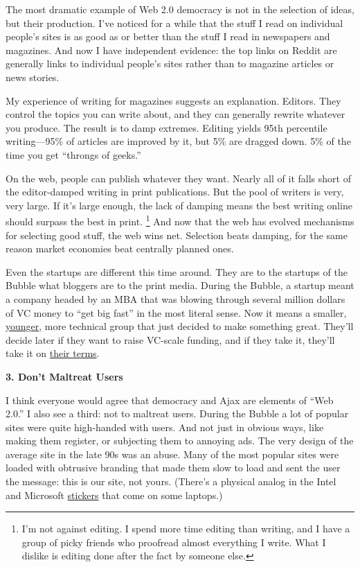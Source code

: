 \documentclass[12pt]{book}
\begin{document}
The most dramatic example of Web 2.0 democracy is not in the selection
of ideas, but their production. I've noticed for a while that the stuff
I read on individual people's sites is as good as or better than the
stuff I read in newspapers and magazines. And now I have independent
evidence: the top links on Reddit are generally links to individual
people's sites rather than to magazine articles or news stories.

My experience of writing for magazines suggests an explanation. Editors.
They control the topics you can write about, and they can generally
rewrite whatever you produce. The result is to damp extremes. Editing
yields 95th percentile writing---95\% of articles are improved by it,
but 5\% are dragged down. 5\% of the time you get ``throngs of geeks.''

On the web, people can publish whatever they want. Nearly all of it
falls short of the editor-damped writing in print publications. But the
pool of writers is very, very large. If it's large enough, the lack of
damping means the best writing online should surpass the best in print.
\footnote{I'm not against editing. I spend more time editing than writing,
and I have a group of picky friends who proofread almost everything I
write. What I dislike is editing done after the fact by someone else.} And now that the web has evolved mechanisms for
selecting good stuff, the web wins net. Selection beats damping, for the
same reason market economies beat centrally planned ones.

Even the startups are different this time around. They are to the
startups of the Bubble what bloggers are to the print media. During the
Bubble, a startup meant a company headed by an MBA that was blowing
through several million dollars of VC money to ``get big fast'' in the
most literal sense. Now it means a smaller, \href{hiring.html}{younger},
more technical group that just decided to make something great. They'll
decide later if they want to raise VC-scale funding, and if they take
it, they'll take it on \href{vcsqueeze.html}{their terms}.

\textbf{3. Don't Maltreat Users}

I think everyone would agree that democracy and Ajax are elements of
``Web 2.0.'' I also see a third: not to maltreat users. During the
Bubble a lot of popular sites were quite high-handed with users. And not
just in obvious ways, like making them register, or subjecting them to
annoying ads. The very design of the average site in the late 90s was an
abuse. Many of the most popular sites were loaded with obtrusive
branding that made them slow to load and sent the user the message: this
is our site, not yours. (There's a physical analog in the Intel and
Microsoft \href{designedforwindows.html}{stickers} that come on some
laptops.)
\end{document}
